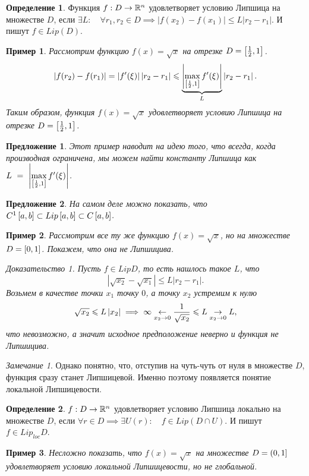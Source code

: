 \documentclass[a5paper, 10pt]{article}
\theoremstyle{definition}
\newtheorem{Def}{Определение}
\theoremstyle{plain}
\newtheorem*{Prop}{Предложение}
\newtheorem{Ex}{Пример}
\theoremstyle{remark}
\newtheorem*{Note}{Замечание}
\newtheorem*{Proof}{Доказательство}
\begin{document}
	\begin{Def}
		Функция $f: D \rightarrow \mathbb{R}^n$ удовлетворяет условию Липшица на множестве $D$, если $\exists L: \quad \forall r_1, r_2 \in D \implies |f(x_2) - f(x_1)| \leqslant L |r_2-r_1|$. И пишут $f\in Lip(D)$.
	\end{Def}
	\begin{Ex}
		Рассмотрим функцию $f(x) = \sqrt{x}$ на отрезке $D=\left[\frac12, 1\right]$.
		\[
		\begin{split}
			\left|f(r_2) - f(r_1)\right| = \left|f'(\xi)\right| \left|r_2-r_1\right| \leqslant \underbrace{\left|\max\limits_{\left[\frac12,1\right]}f'(\xi)\right|}_{L} \left|r_2-r_1\right|.
		\end{split}
		\]
		Таким образом, функция $f(x) = \sqrt{x}$ удовлетворяет условию Липшица на отрезке $D=\left[\frac12,1\right]$.
	\end{Ex}
	\begin{Prop}
		Этот пример наводит на идею того, что всегда, когда производная ограничена, мы можем найти константу Липшица как $L~=~\left|\max\limits_{\left[\frac12,1\right]}f'(\xi)\right|$.
	\end{Prop}
	\begin{Prop}
		На самом деле можно показать, что $C^1\left[a,b\right] \subset Lip\left[a,b\right] \subset C\left[a,b\right]$.
	\end{Prop}
	
	\begin{Ex}
		Рассмотрим все ту же функцию $f(x) = \sqrt{x}$, но на множестве $D=\left[0,1\right]$. Покажем, что она не Липшицива.
		\begin{Proof}
			Пусть $f\in Lip D$, то есть нашлось такое $L$, что
			\[
			|\sqrt{x_2} - \sqrt{x_1}| \leqslant L |r_2-r_1|.
			\]
			Возьмем в качестве точки $x_1$ точку $0$, а точку $x_2$ устремим к нулю
			\[
			\sqrt{x_2} \leqslant L \left|x_2\right| \implies \infty \underset{x_2\rightarrow0}{\leftarrow} \frac{1}{\sqrt{x_2}} \leqslant L \underset{x_2\rightarrow0}{\rightarrow} L,
			\]
			что невозможно, а значит исходное предположение неверно и функция не Липшицива.
		\end{Proof}
	\end{Ex}
	\begin{Note}
		Однако понятно, что, отступив на чуть-чуть от нуля в множестве $D$, функция сразу станет Липшицевой. Именно поэтому появляется понятие локальной Липшицевости.
	\end{Note}
	\begin{Def}
		$f: D \rightarrow \mathbb{R}^n$ удовлетворяет условию Липшица локально на множестве $D$, если $\forall r \in D \implies \exists U(r): \quad f \in Lip(D\cap U)$. И пишут $f\in Lip_{loc} D$.
	\end{Def}
	\begin{Ex}
		Несложно показать, что $f(x) =\sqrt{x}$ на множестве $D=\left(0,1\right]$ удовлетворяет условию локальной Липшицевости, но не глобальной.
	\end{Ex}
\end{document}
